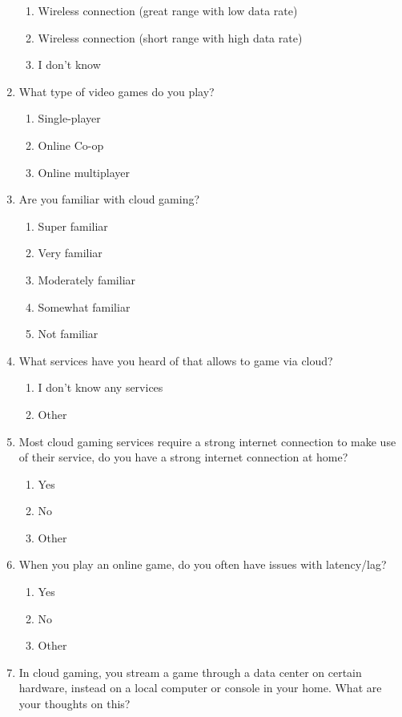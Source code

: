 \begin{enumerate}
\begin{enumerate}
		\item Wireless connection (great range with low data rate)
		\item Wireless connection (short range with high data rate)
		\item I don't know
	\end{enumerate}
	\item What type of video games do you play?
	\begin{enumerate}
		\item Single-player
		\item Online Co-op
		\item Online multiplayer
	\end{enumerate}
\item Are you familiar with cloud gaming?
\begin{enumerate}
	\item Super familiar
	\item Very familiar
	\item Moderately familiar
	\item Somewhat familiar
	\item Not familiar
\end{enumerate}
\item What services have you heard of that allows to game via cloud?
\begin{enumerate}
	\item I don't know any services
	\item Other
\end{enumerate}
	\item Most cloud gaming services require a strong internet connection to make use of their service, do you have a strong internet connection at home?
	\begin{enumerate}
		\item Yes
		\item No
		\item Other
	\end{enumerate}
	\item When you play an online game, do you often have issues with latency/lag?
	\begin{enumerate}
		\item Yes
		\item No
		\item Other
	\end{enumerate}
	\item In cloud gaming, you stream a game through a data center on certain hardware, instead on a local computer or console in your home. What are your thoughts on this?

\end{enumerate}
